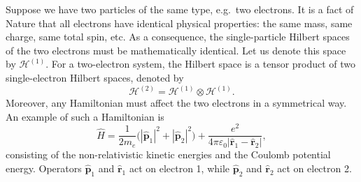 \documentclass[pra,12pt]{revtex4}
\begin{document}
Suppose we have two particles of the same type, e.g.~two electrons.
It is a fact of Nature that all electrons have identical physical
properties: the same mass, same charge, same total spin, etc.  As a
consequence, the single-particle Hilbert spaces of the two electrons
must be mathematically identical.  Let us denote this space by
$\mathscr{H}^{(1)}$.  For a two-electron system, the Hilbert space is
a tensor product of two single-electron Hilbert spaces, denoted by
\begin{equation}
  \mathscr{H}^{(2)} = \mathscr{H}^{(1)} \otimes \mathscr{H}^{(1)}.
\end{equation}
Moreover, any Hamiltonian must affect the two electrons in a
symmetrical way.  An example of such a Hamiltonian is
\begin{equation}
  \hat{H} = \frac{1}{2m_e} \Big(|\hat{\mathbf{p}}_1|^2 + |\hat{\mathbf{p}}_2|^2\Big) + \frac{e^2}{4\pi\varepsilon_0|\hat{\mathbf{r}}_1 - \hat{\mathbf{r}}_2|},
\end{equation}
consisting of the non-relativistic kinetic energies and the Coulomb
potential energy.  Operators $\hat{\mathbf{p}}_1$ and
$\hat{\mathbf{r}}_1$ act on electron 1, while $\hat{\mathbf{p}}_2$ and
$\hat{\mathbf{r}}_2$ act on electron 2.
\end{document}

